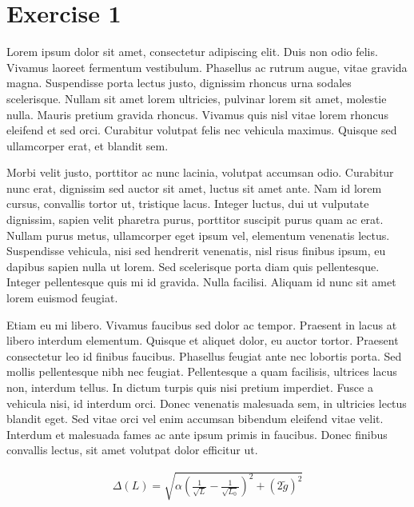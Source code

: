 

\hypersetup{
}
\lfoot{}
\cfoot{}
\rfoot{\thepage}




\section*{Exercise 1}
Lorem ipsum dolor sit amet, consectetur adipiscing elit. Duis non odio felis. Vivamus laoreet fermentum vestibulum. Phasellus ac rutrum augue, vitae gravida magna. Suspendisse porta lectus justo, dignissim rhoncus urna sodales scelerisque. Nullam sit amet lorem ultricies, pulvinar lorem sit amet, molestie nulla. Mauris pretium gravida rhoncus. Vivamus quis nisl vitae lorem rhoncus eleifend et sed orci. Curabitur volutpat felis nec vehicula maximus. Quisque sed ullamcorper erat, et blandit sem.

Morbi velit justo, porttitor ac nunc lacinia, volutpat accumsan odio. Curabitur nunc erat, dignissim sed auctor sit amet, luctus sit amet ante. Nam id lorem cursus, convallis tortor ut, tristique lacus. Integer luctus, dui ut vulputate dignissim, sapien velit pharetra purus, porttitor suscipit purus quam ac erat. Nullam purus metus, ullamcorper eget ipsum vel, elementum venenatis lectus. Suspendisse vehicula, nisi sed hendrerit venenatis, nisl risus finibus ipsum, eu dapibus sapien nulla ut lorem. Sed scelerisque porta diam quis pellentesque. Integer pellentesque quis mi id gravida. Nulla facilisi. Aliquam id nunc sit amet lorem euismod feugiat.

Etiam eu mi libero. Vivamus faucibus sed dolor ac tempor. Praesent in lacus at libero interdum elementum. Quisque et aliquet dolor, eu auctor tortor. Praesent consectetur leo id finibus faucibus. Phasellus feugiat ante nec lobortis porta. Sed mollis pellentesque nibh nec feugiat. Pellentesque a quam facilisis, ultrices lacus non, interdum tellus. In dictum turpis quis nisi pretium imperdiet. Fusce a vehicula nisi, id interdum orci. Donec venenatis malesuada sem, in ultricies lectus blandit eget. Sed vitae orci vel enim accumsan bibendum eleifend vitae velit. Interdum et malesuada fames ac ante ipsum primis in faucibus. Donec finibus convallis lectus, sit amet volutpat dolor efficitur ut.

\begin{align*}
    \Delta(L)=\sqrt{\alpha\left( \frac{1}{\sqrt{L}} - \frac{1}{\sqrt{L_0}}  \right)^2 + (2\tilde{g})^2}
\end{align*}





\newpage
\pagestyle{plain}
\renewcommand*{\bibfont}{\footnotesize}
\printbibliography{}



